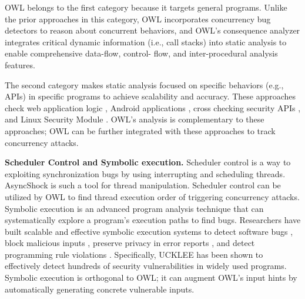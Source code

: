 OWL belongs to the first category because it targets general
programs. Unlike the prior approaches in this category,
OWL incorporates concurrency bug detectors to reason about
concurrent behaviors, and OWL’s consequence analyzer integrates
critical dynamic information (i.e., call stacks) into
static analysis to enable comprehensive data-flow, control-
flow, and inter-procedural analysis features.

The second category \cite{felmetsger2010toward,arzt2014flowdroid,srivastava2011security,zhang:usenix:sec02} makes static analysis
focused on specific behaviors (e.g., APIs) in specific programs
to achieve scalability and accuracy. These approaches check
web application logic \cite{felmetsger2010toward}, Android applications \cite{arzt2014flowdroid}, cross
checking security APIs \cite{srivastava2011security}, and Linux Security
Module \cite{zhang:usenix:sec02}. OWL’s analysis is complementary to these
approaches; OWL can be further integrated with these approaches
to track concurrency attacks.

\noindent
\textbf{Scheduler Control and Symbolic execution.} Scheduler control 
is a way to exploiting synchronization bugs by using interrupting and scheduling threads.
AsyncShock \cite{weichbrodt2016asyncshock} is such a tool for thread manipulation. Scheduler control can be utilized by OWL to 
find thread execution order of triggering concurrency attacks.
Symbolic execution is an advanced program
analysis technique that can systematically explore a program’s
execution paths to find bugs. Researchers have built
scalable and effective symbolic execution systems to detect
software bugs \cite{dart:pldi,cute:fse,godefroid:grammar-fuzzing,godefroid:whitebox-fuzzing,klee:osdi08,yang:malicious-disk:oakland06,cadar:exe:ccs06,s2e:hotdep09,taas:socc10,ramos2015under}, block
malicious inputs \cite{costa:openbsd}, preserve privacy in error reports \cite{castro:bug-report-privacy},
and detect programming rule violations \cite{woodpecker:asplos13}. Specifically,
UCKLEE \cite{ramos2015under} has been shown to effectively detect hundreds
of security vulnerabilities in widely used programs. Symbolic
execution is orthogonal to OWL; it can augment OWL’s input
hints by automatically generating concrete vulnerable inputs.